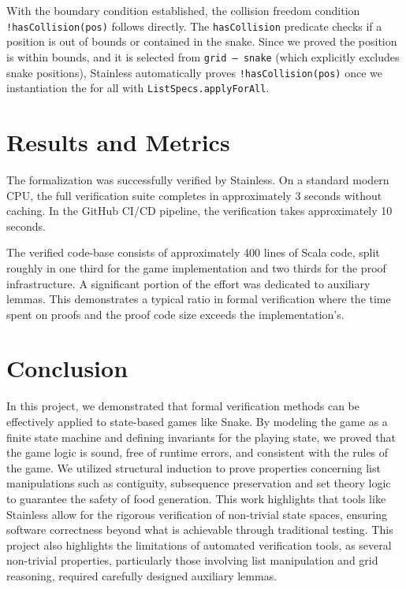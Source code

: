 \documentclass[letterpaper, 11pt]{article}
\begin{document}
With the boundary condition established, the collision freedom condition
\texttt{!hasCollision(pos)} follows directly. The \texttt{hasCollision} predicate checks
if a position is out of bounds or contained in the snake. Since we proved the position is within
bounds, and it is selected from \texttt{grid -- snake} (which explicitly excludes snake
positions), Stainless automatically proves \texttt{!hasCollision(pos)} once we
instantiation the for all with \texttt{ListSpecs.applyForAll}.


\section{Results and Metrics}
The formalization was successfully verified by Stainless. On a standard modern CPU, the full
verification suite completes in approximately 3 seconds without caching. In the GitHub CI/CD
pipeline, the verification takes approximately 10 seconds.

The verified code-base consists of approximately 400 lines of Scala code, split roughly in one third
for the game implementation and two thirds for the proof infrastructure.
A significant portion of the effort was dedicated to auxiliary lemmas.
This demonstrates a typical ratio in formal verification where the time spent on proofs and the
proof code size exceeds the implementation's.


\section{Conclusion}
In this project, we demonstrated that formal verification methods can be effectively applied to
state-based games like Snake. By modeling the game as a finite state machine and defining
invariants for the playing state, we proved that the game logic is sound, free of runtime errors,
and consistent with the rules of the game. We utilized structural induction to prove properties
concerning list manipulations such as contiguity, subsequence preservation and set theory
logic to guarantee the safety of food generation. This work highlights that tools like Stainless
allow for the rigorous verification of non-trivial state spaces, ensuring software correctness
beyond what is achievable through traditional testing.
This project also highlights the limitations of automated verification tools, as several non-trivial
properties, particularly those involving list manipulation and grid reasoning, required carefully
designed auxiliary lemmas.
\end{document}
